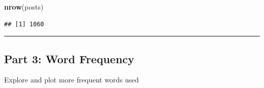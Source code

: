 \documentclass[
]{article}
\newenvironment{Shaded}{\begin{snugshade}}{\end{snugshade}}
\newcommand{\FunctionTok}[1]{\textcolor[rgb]{0.13,0.29,0.53}{\textbf{#1}}}
\newcommand{\NormalTok}[1]{#1}
\begin{document}
\begin{Shaded}
\begin{Highlighting}[]
\FunctionTok{nrow}\NormalTok{(posts) }
\end{Highlighting}
\end{Shaded}

\begin{verbatim}
## [1] 1060
\end{verbatim}

\begin{center}\rule{0.5\linewidth}{0.5pt}\end{center}

\subsection{Part 3: Word Frequency}\label{part-3-word-frequency}

Explore and plot more frequent words used
\end{document}
